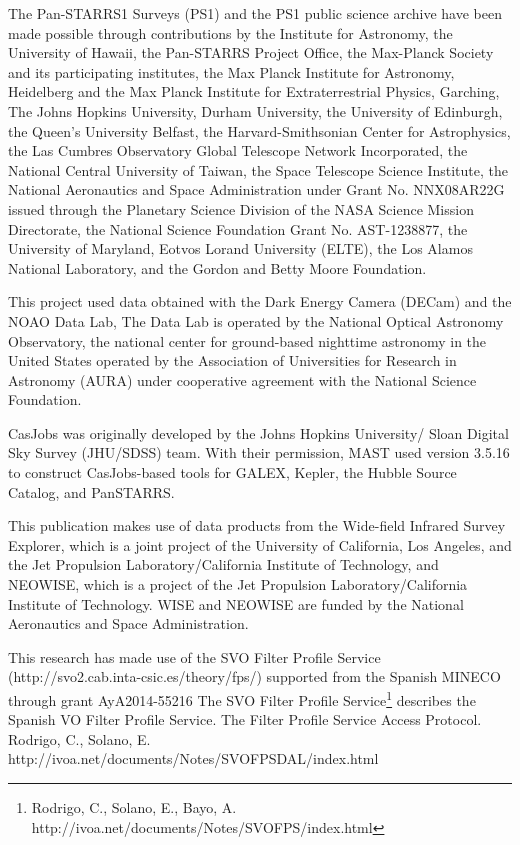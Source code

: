\documentclass[usenatbib]{mnras}
\begin{document}
The Pan-STARRS1 Surveys (PS1) and the PS1 public science archive have
been made possible through contributions by the Institute for
Astronomy, the University of Hawaii, the Pan-STARRS Project Office,
the Max-Planck Society and its participating institutes, the Max
Planck Institute for Astronomy, Heidelberg and the Max Planck
Institute for Extraterrestrial Physics, Garching, The Johns Hopkins
University, Durham University, the University of Edinburgh, the
Queen's University Belfast, the Harvard-Smithsonian Center for
Astrophysics, the Las Cumbres Observatory Global Telescope Network
Incorporated, the National Central University of Taiwan, the Space
Telescope Science Institute, the National Aeronautics and Space
Administration under Grant No. NNX08AR22G issued through the Planetary
Science Division of the NASA Science Mission Directorate, the National
Science Foundation Grant No. AST-1238877, the University of Maryland,
Eotvos Lorand University (ELTE), the Los Alamos National Laboratory,
and the Gordon and Betty Moore Foundation.

This project used data obtained with the Dark Energy Camera (DECam)
and the NOAO Data Lab, The Data Lab is operated by the National
Optical Astronomy Observatory, the national center for ground-based
nighttime astronomy in the United States operated by the Association
of Universities for Research in Astronomy (AURA) under cooperative
agreement with the National Science Foundation.

CasJobs was originally developed by the Johns Hopkins University/
Sloan Digital Sky Survey (JHU/SDSS) team. With their permission, MAST
used version 3.5.16 to construct CasJobs-based tools for GALEX,
Kepler, the Hubble Source Catalog, and PanSTARRS.

This publication makes use of data products from the Wide-field
Infrared Survey Explorer, which is a joint project of the University
of California, Los Angeles, and the Jet Propulsion
Laboratory/California Institute of Technology, and NEOWISE, which is a
project of the Jet Propulsion Laboratory/California Institute of
Technology. WISE and NEOWISE are funded by the National Aeronautics
and Space Administration.

This research has made use of the SVO Filter Profile Service
(http://svo2.cab.inta-csic.es/theory/fps/) supported from the Spanish
MINECO through grant AyA2014-55216 
The SVO Filter Profile Service\footnote{Rodrigo, C., Solano, E., Bayo, A. http://ivoa.net/documents/Notes/SVOFPS/index.html}
describes the Spanish VO Filter Profile Service. 
The Filter Profile Service Access Protocol. Rodrigo, C., Solano, E. http://ivoa.net/documents/Notes/SVOFPSDAL/index.html
\end{document}
